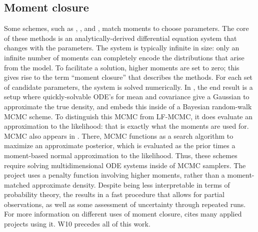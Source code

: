 \documentclass{article}
\begin{document}
\subsection{Moment closure}
Some schemes, such as \cite{milner2013moment}, \cite{kugler2012moment}, and \cite{zechner2012moment}, match moments to choose parameters. The core of these methods is an analytically-derived differential equation system that changes with the parameters. The system is typically infinite in size: only an infinite number of moments can completely encode the distributions that arise from the model. To facilitate a solution, higher moments are set to zero; this gives rise to the term ``moment closure'' that describes the methods. For each set of candidate parameters, the system is solved numerically. In \cite{milner2013moment}, the end result is a setup where quickly-solvable ODE's for mean and covariance give a Gaussian to approximate the true density, and \cite{milner2013moment} embeds this inside of a Bayesian random-walk MCMC scheme. To distinguish this MCMC from LF-MCMC, it does evaluate an approximation to the likelihood: that is exactly what the moments are used for. MCMC also appears in \cite{zechner2012moment}. There, MCMC functions as a search algorithm to maximize an approximate posterior, which is evaluated as the prior times a moment-based normal approximation to the likelihood. Thus, these schemes require solving multidimensional ODE systems inside of MCMC samplers. The project  \cite{kugler2012moment} uses a penalty function involving higher moments, rather than a moment-matched approximate density. Despite being less interpretable in terms of probability theory, the results in a fast procedure that allows for partial observations, as well as some assessment of uncertainty through repeated runs. For more information on different uses of moment closure, \cite{Milner201199} cites many applied projects using it. W10 precedes all of this work. 
\end{document}
